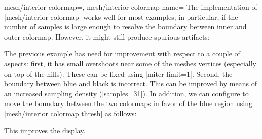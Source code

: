 {{\begin{pgfplotskeylist}{%
    mesh/interior colormap=,%
    mesh/interior colormap name=%
}
    The implementation of |mesh/interior colormap| works well for most
    examples; in particular, if the number of samples is large enough to
    resolve the boundary between inner and outer colormap. However, it might
    still produce spurious artifacts:
\pgfplotsexpensiveexample
\begin{codeexample}[]
\end{codeexample}
    \noindent The previous example has need for improvement with respect to a
    couple of aspects: first, it has small overshoots near some of the meshes
    vertices (especially on top of the hills). These can be fixed using
    |miter limit=1|. Second, the boundary between blue and black is incorrect.
    This can be improved by means of an increased sampling density
    (|samples=31|). In addition, we can configure \PGFPlots{} to move the
    boundary between the two colormaps in favor of the blue region using
    |mesh/interior colormap thresh| as follows:
\pgfplotsexpensiveexample
\begin{codeexample}[]
\end{codeexample}
    \noindent This improves the display.



\end{pgfplotskeylist}}}
